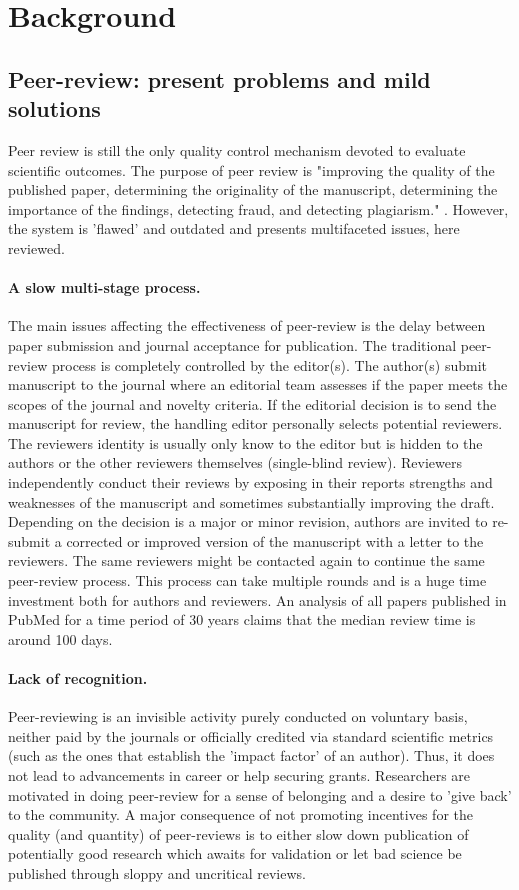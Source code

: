 \documentclass[runningheads]{llncs}
\begin{document}
\section{Background}
\subsection{Peer-review: present problems and mild solutions}
Peer review is still the only quality control mechanism devoted to evaluate scientific outcomes. The purpose of peer review is "improving the quality of the published paper, determining the originality of the manuscript, determining the importance of the findings, detecting fraud, and detecting plagiarism." \cite{Gropp-PeerRevStress}. However, the system is 'ﬂawed' and outdated \cite{Smith2006} and presents multifaceted issues, here reviewed.
\paragraph{A slow multi-stage process.} The main issues affecting the effectiveness of peer-review is the delay between paper submission and journal acceptance for publication. The traditional peer-review process is completely controlled by the editor(s). The author(s) submit manuscript to the journal where an editorial team assesses if the paper meets the scopes of the journal and novelty criteria. If the editorial decision is to send the manuscript for review, the handling editor personally selects potential reviewers. The reviewers identity is usually only know to the editor but is hidden to the authors or the other reviewers themselves (single-blind review). Reviewers independently conduct their reviews by exposing in their reports strengths and weaknesses of the manuscript and sometimes substantially improving the draft. Depending on the decision is a major or minor revision, authors are invited to re-submit a corrected or improved version of the manuscript with a letter to the reviewers. The same reviewers might be contacted again to continue the same peer-review process. This process can take multiple rounds and is a huge time investment both for authors and reviewers. An analysis of all papers published in PubMed for a time period of 30 years claims that the median review time is around 100 days\cite{Kendall-peerrev}.
\paragraph{Lack of recognition.} Peer-reviewing is an invisible activity purely conducted on voluntary basis, neither paid by the journals or officially credited via standard scientific metrics (such as the ones that establish the 'impact factor' of an author). Thus, it does not lead to advancements in career or help securing grants. Researchers are motivated in doing peer-review for a sense of belonging and a desire to 'give back' to the community. A major consequence of not promoting incentives for the quality (and quantity) of peer-reviews is to either slow down publication of potentially good research which awaits for validation or let bad science be published through sloppy and uncritical reviews.
\end{document}
